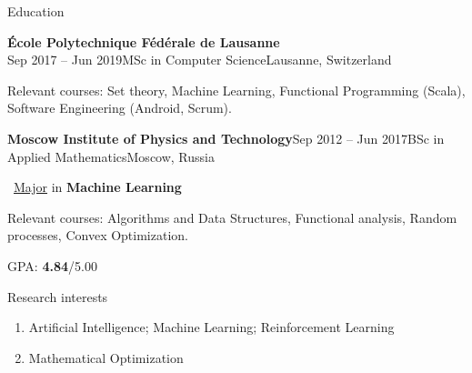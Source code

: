 \documentclass{resume} %
\begin{document}
\begin{rSection}{Education}
\begin{rSubsection}{\bf \'Ecole Polytechnique F\'ed\'erale de Lausanne}{\\Sep 2017 -- Jun 2019}{MSc in Computer Science}{Lausanne, Switzerland}
\item Relevant courses: Set theory, Machine Learning, Functional Programming (Scala), Software Engineering (Android, Scrum).
\end{rSubsection}

\begin{rSubsection}{\bf Moscow Institute of Physics and Technology}{Sep 2012 -- Jun 2017}{BSc in Applied Mathematics}{Moscow, Russia}
\item \faExternalLink~\href{http://www.machinelearning.ru/}{Major} in {\bf Machine Learning}
\item Relevant courses: Algorithms and Data Structures, Functional analysis, Random processes, Convex Optimization.
\item GPA: {\bf 4.84}/5.00
\end{rSubsection}
\end{rSection}

\begin{rSection}{Research interests}
\begin{enumerate}
\item Artificial Intelligence; Machine Learning; Reinforcement Learning
\item Mathematical Optimization
\end{enumerate}
\end{rSection}
\end{document}
